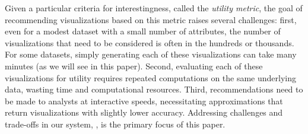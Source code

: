 

Given a particular criteria for interestingness, called the {\em utility metric},
the goal of recommending visualizations based on this metric 
raises several challenges:
first, even for a modest dataset with a small number
of attributes, the number of  
visualizations that need to be considered is often in the hundreds or thousands.
For some datasets, simply generating each of these visualizations can take many minutes 
(as we will see in this paper).
Second, evaluating each of these visualizations for utility requires repeated
computations on the same underlying data, wasting time and computational resources.
Third, recommendations need to be made to analysts at interactive speeds,
necessitating approximations that return visualizations with slightly lower accuracy. 
Addressing challenges and trade-offs in our system, \SeeDB, 
is the primary focus of this paper. 






